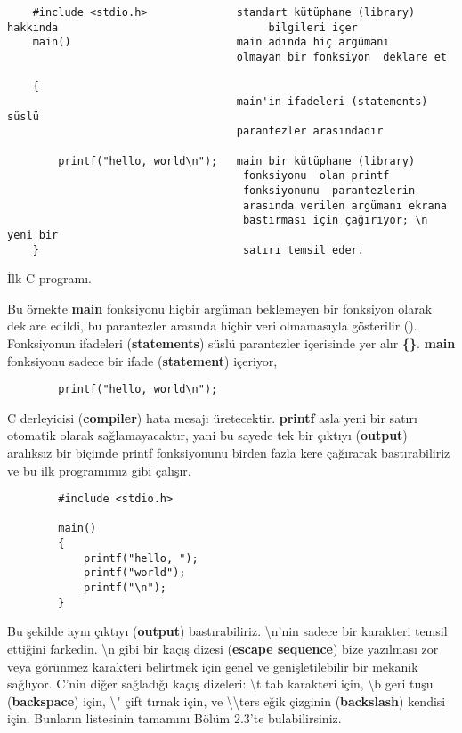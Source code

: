 \documentclass[a4paper,12pt,oneside]{book}
\begin{document}
\begin{lstlisting}
    #include <stdio.h>              standart kütüphane (library) hakkında                                 bilgileri içer
    main()                          main adında hiç argümanı
                                    olmayan bir fonksiyon  deklare et

    {
                                    main'in ifadeleri (statements) süslü
                                    parantezler arasındadır

        printf("hello, world\n");   main bir kütüphane (library)
                                     fonksiyonu  olan printf
                                     fonksiyonunu  parantezlerin
                                     arasında verilen argümanı ekrana
                                     bastırması için çağırıyor; \n yeni bir
    }                                satırı temsil eder.
\end{lstlisting}
\begin{center}İlk C programı.\end{center}
\pagebreak

Bu örnekte \textbf{main} fonksiyonu  hiçbir argüman  beklemeyen bir fonksiyon  olarak deklare edildi, bu parantezler arasında hiçbir veri olmamasıyla gösterilir ().
Fonksiyonun ifadeleri (\textbf{statements}) süslü parantezler içerisinde yer alır \textbf{\{\}}. \textbf{main} fonksiyonu sadece bir ifade (\textbf{statement}) içeriyor,
\begin{lstlisting}
		printf("hello, world\n");
\end{lstlisting}
C derleyicisi (\textbf{compiler}) hata mesajı üretecektir.
\textbf{printf} asla yeni bir satırı otomatik olarak sağlamayacaktır, yani bu sayede tek bir çıktıyı (\textbf{output}) aralıksız bir biçimde printf fonksiyonunu  birden fazla kere çağırarak bastırabiliriz ve bu ilk programımız gibi çalışır.

\begin{lstlisting}
		#include <stdio.h>

		main()
		{
			printf("hello, ");
			printf("world");
			printf("\n");
		}
\end{lstlisting}

Bu şekilde aynı çıktıyı (\textbf{output}) bastırabiliriz.
\textbackslash n'nin sadece bir karakteri temsil ettiğini farkedin. \textbackslash n  gibi bir kaçış dizesi (\textbf{escape sequence}) bize yazılması zor veya görünmez karakteri belirtmek için genel ve genişletilebilir bir mekanik sağlıyor. C'nin diğer sağladığı kaçış dizeleri: \textbackslash t tab karakteri için, \textbackslash b geri tuşu (\textbf{backspace}) için, \textbackslash " çift tırnak için, ve  \textbackslash \textbackslash \hspace*{1mm}ters eğik çizginin (\textbf{backslash}) kendisi için. Bunların listesinin tamamını Bölüm 2.3'te bulabilirsiniz. \\
\end{document}
